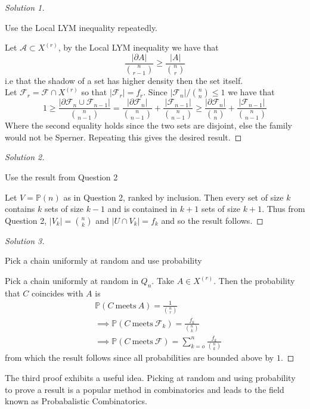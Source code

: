 \documentclass[a4paper]{article}
\newcommand{\shadow}{\partial}
\renewcommand{\P}{\mathbb P}
\begin{document}
\begin{proof}[Solution 1]
  \begin{idea}
    Use the Local LYM inequality repeatedly.
  \end{idea}
  Let $\mathcal{A} \subset X^{(r)}$, by the Local LYM inequality we have that
  \[\frac{|\shadow{A}|}{{n \choose r-1}} \geq \frac{|A|}{{n \choose r}} \]
  i.e that the shadow of a set has higher density then the set itself.\\
  Let $\mathcal{F}_r = \mathcal{F} \cap X^{(r)}$ so that $|\mathcal{F}_r| = f_r$. Since $|\mathcal{F}_n| / {n \choose n} \leq 1$ we have that
  \[1 \geq \frac{|\shadow{\mathcal{F}_n} \cup \mathcal{F}_{n-1}|}{{n \choose
        n-1}} = \frac{|\shadow{\mathcal{F}_n}|}{{n \choose n-1}} +
    \frac{|\mathcal{F}_{n-1}|}{{n \choose n-1}} \geq \frac{|\shadow{\mathcal{F}_n}|}{{n \choose n}} +
    \frac{|\mathcal{F}_{n-1}|}{{n \choose n-1}} \]
  Where the second equality holds since the two sets are disjoint, else the
  family would not be Sperner. Repeating this gives the desired result.
\end{proof}

\begin{proof}[Solution 2]
  \begin{idea}
    Use the result from Question 2
  \end{idea}
  Let $V = \P(n)$ as in Question 2, ranked by inclusion. Then every set of size
  $k$ contains $k$ sets of size $k-1$ and is contained in $k+1$ sets of size
  $k+1$. Thus from Question 2, $|V_k| = {n \choose k}$ and $| U \cap V_k| = f_k$
  and so the result follows.
  \end{proof}
  \begin{proof}[Solution 3]
    \begin{idea}
      Pick a chain uniformly at random and use probability
    \end{idea}

    Pick a chain uniformly at random in $Q_n$. Take $A \in X^{(r)}$. Then the
    probability that $C$ coincides with $A$ is
    \begin{align}
      &\P(C \ \text{meets} \ A) = \frac{1}{{n \choose r}}\\
      &\implies \P(C \ \text{meets} \ \mathcal{F}_k) = \frac{f_k}{{n \choose k}}\\
      &\implies \P(C \ \text{meets} \ \mathcal{F}) = \sum_{k=o}^n \frac{f_k}{{n \choose k}}
    \end{align}
    from which the result follows since all probabilities are bounded above by
    $1$.
  \end{proof}
  \begin{remark}
    The third proof exhibits a useful idea. Picking at random and using
    probability to prove a result is a popular method in combinatorics and leads
    to the field known as Probabalistic Combinatorics.
  \end{remark}
\end{document}
